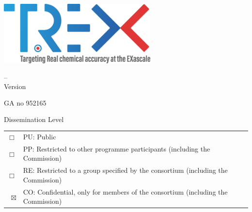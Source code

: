 
\pagestyle{empty}

\begin{center}

\phantom{} \\  \vspace{2cm}
  \begin{flushright}\SubDate\\\end{flushright}
  \includegraphics[width=0.6\textwidth]{images/trex-logo.png}

  \vspace{2cm}

    {\Huge \DelNumber{} -- \DelTitle}\\\vspace{1cm}
    {Version \DelVersion}

 \vspace*{\fill}

  {\Huge {GA no 952165}}
  \vspace{1cm}


\end{center}
\noindent
  Dissemination Level\\[5mm]
\newcommand{\Dissemination}{CO}    %
  \begin{tabular*} {\textwidth}{rl}
$\Box$       & PU: Public  \\      %
$\Box$       & PP: Restricted to other programme participants (including the Commission) \\
$\Box$       & RE: Restricted to a group specified by the consortium (including the Commission) \\
$\boxtimes$      & CO: Confidential, only for members of the consortium (including the Commission)
  \end{tabular*} \\





\pagestyle{fancy}
\fancyhf{}


